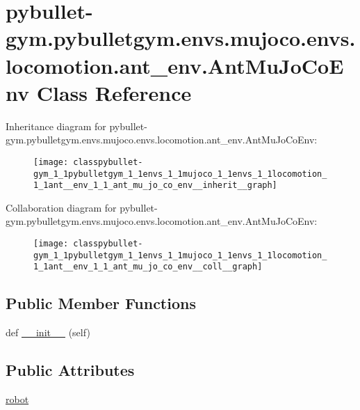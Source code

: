 \hypertarget{classpybullet-gym_1_1pybulletgym_1_1envs_1_1mujoco_1_1envs_1_1locomotion_1_1ant__env_1_1_ant_mu_jo_co_env}{}\section{pybullet-\/gym.pybulletgym.\+envs.\+mujoco.\+envs.\+locomotion.\+ant\+\_\+env.\+Ant\+Mu\+Jo\+Co\+Env Class Reference}
\label{classpybullet-gym_1_1pybulletgym_1_1envs_1_1mujoco_1_1envs_1_1locomotion_1_1ant__env_1_1_ant_mu_jo_co_env}


Inheritance diagram for pybullet-\/gym.pybulletgym.\+envs.\+mujoco.\+envs.\+locomotion.\+ant\+\_\+env.\+Ant\+Mu\+Jo\+Co\+Env\+:
\nopagebreak
\begin{figure}[H]
\begin{center}
\leavevmode
\texttt{[image: classpybullet-gym\_1\_1pybulletgym\_1\_1envs\_1\_1mujoco\_1\_1envs\_1\_1locomotion\_1\_1ant\_\_env\_1\_1\_ant\_mu\_jo\_co\_env\_\_inherit\_\_graph]}
\end{center}
\end{figure}


Collaboration diagram for pybullet-\/gym.pybulletgym.\+envs.\+mujoco.\+envs.\+locomotion.\+ant\+\_\+env.\+Ant\+Mu\+Jo\+Co\+Env\+:
\nopagebreak
\begin{figure}[H]
\begin{center}
\leavevmode
\texttt{[image: classpybullet-gym\_1\_1pybulletgym\_1\_1envs\_1\_1mujoco\_1\_1envs\_1\_1locomotion\_1\_1ant\_\_env\_1\_1\_ant\_mu\_jo\_co\_env\_\_coll\_\_graph]}
\end{center}
\end{figure}
\subsection*{Public Member Functions}
\begin{DoxyCompactItemize}
\item 
def \hyperlink{classpybullet-gym_1_1pybulletgym_1_1envs_1_1mujoco_1_1envs_1_1locomotion_1_1ant__env_1_1_ant_mu_jo_co_env_a8472d8a1fb0fb1c98fbb8dc35f1c0a71}{\+\_\+\+\_\+init\+\_\+\+\_\+} (self)
\end{DoxyCompactItemize}
\subsection*{Public Attributes}
\begin{DoxyCompactItemize}
\item 
\hyperlink{classpybullet-gym_1_1pybulletgym_1_1envs_1_1mujoco_1_1envs_1_1locomotion_1_1ant__env_1_1_ant_mu_jo_co_env_a869a329714e682f8ec3265133937c5d8}{robot}
\end{DoxyCompactItemize}


